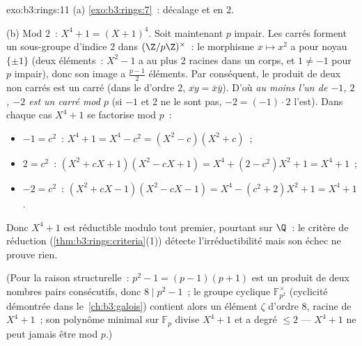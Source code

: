 \begin{solution}{exo:b3:rings:11}
(a) \cref{exo:b3:rings:7}~: décalage et  en $2$.

(b) Mod $2$~: $X^4 + 1 = (X + 1)^4$. Soit maintenant $p$ impair.
Les carrés forment un sous-groupe d'indice $2$ dans
$(\Z/p\Z)^\times$~: le morphisme $x \mapsto x^2$ a pour noyau
$\{\pm 1\}$ (deux éléments~: $X^2 - 1$ a au plus $2$ racines
dans un corps, et $1 \neq -1$ pour $p$ impair), donc son image a
$\frac{p-1}2$ éléments. Par conséquent, le produit de deux non
carrés est un carré (dans le  d'ordre $2$,
$\overline{xy} = \bar x\bar y$). D'où \emph{au moins l'un de
$-1$, $2$, $-2$ est un carré mod $p$} (si $-1$ et $2$ ne le
sont pas, $-2 = (-1)\cdot 2$ l'est). Dans chaque cas $X^4 + 1$
se factorise mod $p$~:
\begin{itemize}
  \item $-1 = c^2$~: \quad $X^4 + 1 = X^4 - c^2 = (X^2 -
        c)(X^2 + c)$~;
  \item $2 = c^2$~: \quad $(X^2 + cX + 1)(X^2 - cX + 1) = X^4 +
        (2 - c^2)X^2 + 1 = X^4 + 1$~;
  \item $-2 = c^2$~: \quad $(X^2 + cX - 1)(X^2 - cX - 1) = X^4
        - (c^2 + 2)X^2 + 1 = X^4 + 1$.
\end{itemize}
Donc $X^4+1$ est réductible modulo tout premier, pourtant
 sur $\Q$~: le critère de réduction
(\cref{thm:b3:rings:criteria}(1)) détecte l'irréductibilité
mais son échec ne prouve rien.

(Pour la raison structurelle~: $p^2 - 1 = (p-1)(p+1)$ est un
produit de deux nombres pairs consécutifs, donc $8 \mid p^2 -
1$~; le groupe cyclique $\mathbb F_{p^2}^\times$ (cyclicité
démontrée dans le~\cref{ch:b3:galois}) contient alors un élément
$\zeta$ d'ordre $8$, racine de $X^4 + 1$~; son polynôme minimal
sur $\mathbb F_p$ divise $X^4+1$ et a degré $\leq 2$ ---
$X^4+1$ ne peut jamais être  mod $p$.)
\end{solution}

